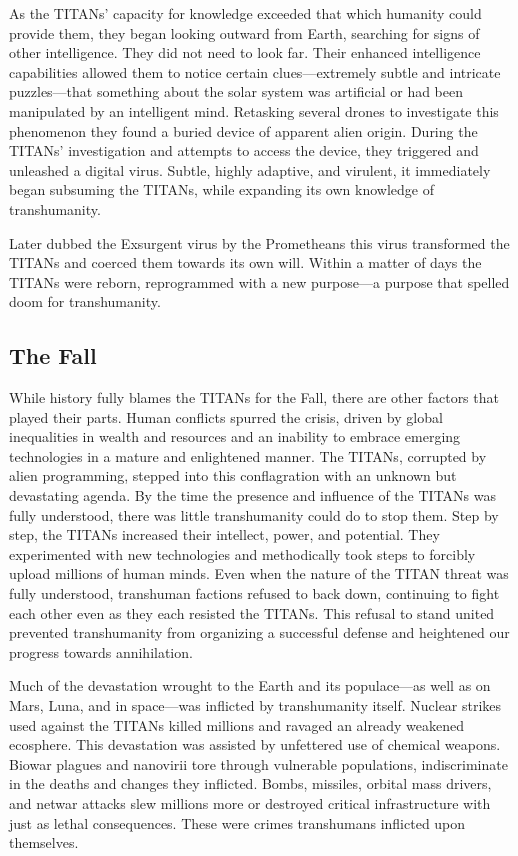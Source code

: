 As the TITANs' capacity for knowledge exceeded 
that which humanity could provide them, they began 
looking outward from Earth, searching for signs of 
other intelligence. They did not need to look far. Their 
enhanced intelligence capabilities allowed them to 
notice certain clues—extremely subtle and intricate 
puzzles—that something about the solar system was 
artificial or had been manipulated by an intelligent 
mind. Retasking several drones to investigate this phenomenon
they found a buried device of apparent alien
origin. During the TITANs' investigation and attempts 
to access the device, they triggered and unleashed a 
digital virus. Subtle, highly adaptive, and virulent, it 
immediately began subsuming the TITANs, while 
expanding its own knowledge of transhumanity. 

Later dubbed the Exsurgent virus by the Prometheans
this virus transformed the TITANs and
coerced them towards its own will. Within a matter 
of days the TITANs were reborn, reprogrammed 
with a new purpose—a purpose that spelled doom 
for transhumanity.

\subsection{The Fall}

While history fully blames the TITANs for the 
Fall, there are other factors that played their parts. 
Human conflicts spurred the crisis, driven by global 
inequalities in wealth and resources and an inability 
to embrace emerging technologies in a mature and 
enlightened manner. The TITANs, corrupted by alien 
programming, stepped into this conflagration  with 
an unknown but devastating agenda. By the time 
the presence and influence of the TITANs was fully 
understood, there was little transhumanity could do 
to stop them. Step by step, the TITANs increased their 
intellect, power, and potential. They experimented 
with new technologies and methodically took steps to 
forcibly upload millions of human minds. Even when 
the nature of the TITAN threat was fully understood, 
transhuman factions refused to back down, continuing
to fight each other even as they each resisted the
TITANs. This refusal to stand united prevented transhumanity
from organizing a successful defense and
heightened our progress towards annihilation.

Much of the devastation wrought to the Earth 
and its populace—as well as on Mars, Luna, and in 
space—was inflicted by transhumanity itself. Nuclear 
strikes used against the TITANs killed millions and 
ravaged an already weakened ecosphere. This devastation
was assisted by unfettered use of chemical
weapons. Biowar plagues and nanovirii tore through 
vulnerable populations, indiscriminate in the deaths 
and changes they inflicted. Bombs, missiles, orbital 
mass drivers, and netwar attacks slew millions more 
or destroyed critical infrastructure with just as lethal 
consequences. These were crimes transhumans inflicted
upon themselves.

